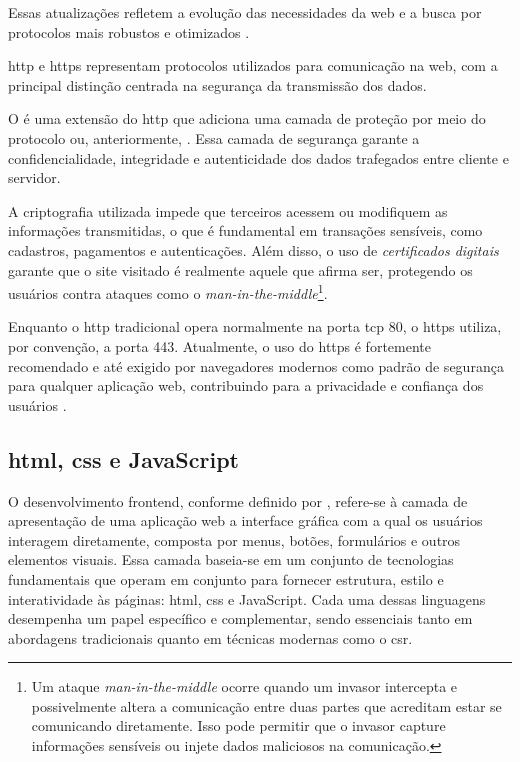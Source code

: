 Essas atualizações refletem a evolução das necessidades da web e a busca por protocolos mais robustos e otimizados \cite{cloudflare_http}.

\acrshort{http} e \acrshort{https} representam protocolos utilizados para comunicação na web, com a principal distinção centrada na segurança da transmissão dos dados.

O  é uma extensão do \acrshort{http} que adiciona uma camada de proteção por meio do protocolo  ou, anteriormente, . Essa camada de segurança garante a confidencialidade, integridade e autenticidade dos dados trafegados entre cliente e servidor.

A criptografia utilizada impede que terceiros acessem ou modifiquem as informações transmitidas, o que é fundamental em transações sensíveis, como cadastros, pagamentos e autenticações. Além disso, o uso de \textit{certificados digitais} garante que o site visitado é realmente aquele que afirma ser, protegendo os usuários contra ataques como o \textit{man-in-the-middle}\footnote{Um ataque \textit{man-in-the-middle} ocorre quando um invasor intercepta e possivelmente altera a comunicação entre duas partes que acreditam estar se comunicando diretamente. Isso pode permitir que o invasor capture informações sensíveis ou injete dados maliciosos na comunicação.\cite{wikipedia_man_in_the_middle}}.

Enquanto o \acrshort{http} tradicional opera normalmente na porta \acrshort{tcp} 80, o \acrshort{https} utiliza, por convenção, a porta 443. Atualmente, o uso do \acrshort{https} é fortemente recomendado e até exigido por navegadores modernos como padrão de segurança para qualquer aplicação web, contribuindo para a privacidade e confiança dos usuários \cite{wikipedia_http}.

\subsection{\acrshort{html}, \acrshort{css} e JavaScript}
\label{subsec:html-css-js}


O desenvolvimento frontend, conforme definido por , refere-se à camada de apresentação de uma aplicação web a interface gráfica com a qual os usuários interagem diretamente, composta por menus, botões, formulários e outros elementos visuais. Essa camada baseia-se em um conjunto de tecnologias fundamentais que operam em conjunto para fornecer estrutura, estilo e interatividade às páginas: \acrshort{html}, \acrshort{css} e JavaScript. Cada uma dessas linguagens desempenha um papel específico e complementar, sendo essenciais tanto em abordagens tradicionais quanto em técnicas modernas como o \acrshort{csr}.


